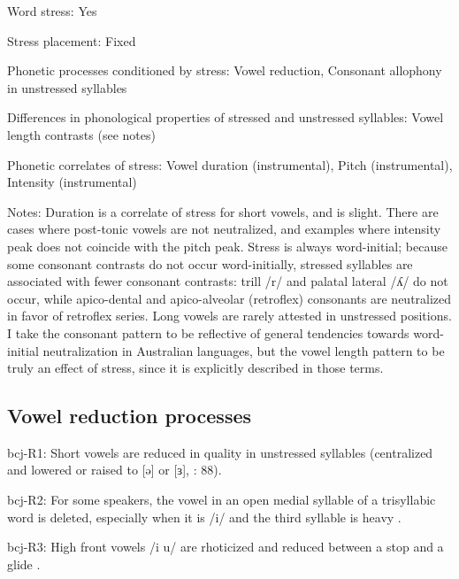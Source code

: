 {\begin{appendixdesc}
\item[Word stress:] Yes

\item[Stress placement:] Fixed

\item[Phonetic processes conditioned by stress:] Vowel reduction, Consonant allophony in unstressed syllables

\item[Differences in phonological properties of stressed and unstressed syllables:] Vowel length contrasts (see notes)

\item[Phonetic correlates of stress:] Vowel duration (instrumental), Pitch (instrumental), Intensity (instrumental)

\item[Notes:] Duration is a correlate of stress for short vowels, and is slight. There are cases where post-tonic vowels are not neutralized, and examples where intensity peak does not coincide with the pitch peak. Stress is always word-initial; because some consonant contrasts do not occur word-initially, stressed syllables are associated with fewer consonant contrasts: trill /r/ and palatal lateral /ʎ/ do not occur, while apico-dental and apico-alveolar (retroflex) consonants are neutralized in favor of retroflex series. Long vowels are rarely attested in unstressed positions. I take the consonant pattern to be reflective of general tendencies towards word-initial neutralization in Australian languages, but the vowel length pattern to be truly an effect of stress, since it is explicitly described in those terms.
\end{appendixdesc}
\subsection*{Vowel reduction processes}
\begin{appendixdesc}

\item[bcj-R1:] Short vowels are reduced in quality in unstressed syllables (centralized and lowered or raised to [ə] or [ɜ], \citealt{Bowern2012}: 88).

\item[bcj-R2:] For some speakers, the vowel in an open medial syllable of a trisyllabic word is deleted, especially when it is /i/ and the third syllable is heavy \citep[91]{Bowern2012}.

\item[bcj-R3:] High front vowels /i u/ are rhoticized and reduced between a stop and a glide \citep[91]{Bowern2012}.


\end{appendixdesc}}

